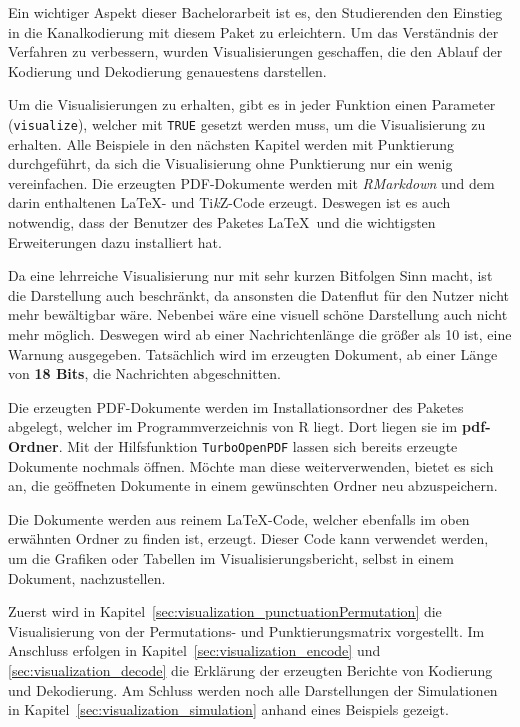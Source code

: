 Ein wichtiger Aspekt dieser Bachelorarbeit ist es, den Studierenden den Einstieg in die Kanalkodierung mit diesem Paket zu erleichtern. Um das Verständnis der Verfahren zu verbessern, wurden Visualisierungen geschaffen, die den Ablauf der Kodierung und Dekodierung genauestens darstellen.

Um die Visualisierungen zu erhalten, gibt es in jeder Funktion einen Parameter (\texttt{visualize}), welcher mit \texttt{TRUE} gesetzt werden muss, um die Visualisierung zu erhalten. Alle Beispiele in den nächsten Kapitel werden mit Punktierung durchgeführt, da sich die Visualisierung ohne Punktierung nur ein wenig vereinfachen. Die erzeugten PDF-Dokumente werden mit \emph{RMarkdown} und dem darin enthaltenen \LaTeX - und Ti\textit{k}Z-Code erzeugt. Deswegen ist es auch notwendig, dass der Benutzer des Paketes \LaTeX\ und die wichtigsten Erweiterungen dazu installiert hat.

Da eine lehrreiche Visualisierung nur mit sehr kurzen Bitfolgen Sinn macht, ist die Darstellung auch beschränkt, da ansonsten die Datenflut für den Nutzer nicht mehr bewältigbar wäre. Nebenbei wäre eine visuell schöne Darstellung auch nicht mehr möglich. Deswegen wird ab einer Nachrichtenlänge die größer als 10 ist, eine Warnung ausgegeben. Tatsächlich wird im erzeugten Dokument, ab einer Länge von \textbf{18 Bits}, die Nachrichten abgeschnitten.

Die erzeugten PDF-Dokumente werden im Installationsordner des Paketes abgelegt, welcher im Programmverzeichnis von R liegt. Dort liegen sie im \textbf{pdf-Ordner}. Mit der Hilfsfunktion \texttt{TurboOpenPDF} lassen sich bereits erzeugte Dokumente nochmals öffnen. Möchte man diese weiterverwenden, bietet es sich an, die geöffneten Dokumente in einem gewünschten Ordner neu abzuspeichern.

Die Dokumente werden aus reinem \LaTeX -Code, welcher ebenfalls im oben erwähnten Ordner zu finden ist, erzeugt. Dieser Code kann verwendet werden, um die Grafiken oder Tabellen im Visualisierungsbericht, selbst in einem Dokument, nachzustellen.

Zuerst wird in Kapitel~\ref{sec:visualization_punctuationPermutation} die Visualisierung von der Permutations- und Punktierungsmatrix vorgestellt. Im Anschluss erfolgen in Kapitel~\ref{sec:visualization_encode} und \ref{sec:visualization_decode} die Erklärung der erzeugten Berichte von Kodierung und Dekodierung. Am Schluss werden noch alle Darstellungen der Simulationen in Kapitel~\ref{sec:visualization_simulation} anhand eines Beispiels gezeigt. 
